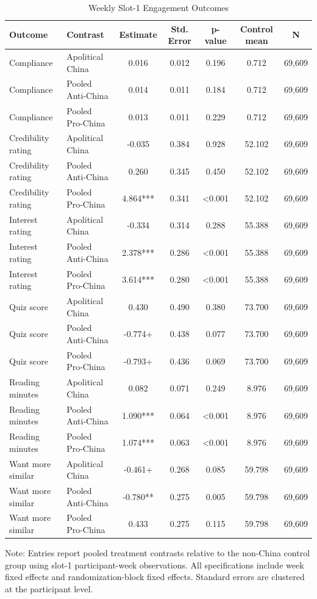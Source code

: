 \begin{table}[H]
\centering
\caption{Weekly Slot-1 Engagement Outcomes}
\label{tab:weekly_panel_slot1}
\footnotesize
\begin{threeparttable}
\begin{tabular}{llccccc}
\toprule
Outcome & Contrast & Estimate & Std. Error & p-value & Control mean & N \\
\midrule
Compliance & Apolitical China & 0.016 & 0.012 & 0.196 & 0.712 & 69,609 \\
Compliance & Pooled Anti-China & 0.014 & 0.011 & 0.184 & 0.712 & 69,609 \\
Compliance & Pooled Pro-China & 0.013 & 0.011 & 0.229 & 0.712 & 69,609 \\
Credibility rating & Apolitical China & -0.035 & 0.384 & 0.928 & 52.102 & 69,609 \\
Credibility rating & Pooled Anti-China & 0.260 & 0.345 & 0.450 & 52.102 & 69,609 \\
Credibility rating & Pooled Pro-China & 4.864*** & 0.341 & <0.001 & 52.102 & 69,609 \\
Interest rating & Apolitical China & -0.334 & 0.314 & 0.288 & 55.388 & 69,609 \\
Interest rating & Pooled Anti-China & 2.378*** & 0.286 & <0.001 & 55.388 & 69,609 \\
Interest rating & Pooled Pro-China & 3.614*** & 0.280 & <0.001 & 55.388 & 69,609 \\
Quiz score & Apolitical China & 0.430 & 0.490 & 0.380 & 73.700 & 69,609 \\
Quiz score & Pooled Anti-China & -0.774+ & 0.438 & 0.077 & 73.700 & 69,609 \\
Quiz score & Pooled Pro-China & -0.793+ & 0.436 & 0.069 & 73.700 & 69,609 \\
Reading minutes & Apolitical China & 0.082 & 0.071 & 0.249 & 8.976 & 69,609 \\
Reading minutes & Pooled Anti-China & 1.090*** & 0.064 & <0.001 & 8.976 & 69,609 \\
Reading minutes & Pooled Pro-China & 1.074*** & 0.063 & <0.001 & 8.976 & 69,609 \\
Want more similar & Apolitical China & -0.461+ & 0.268 & 0.085 & 59.798 & 69,609 \\
Want more similar & Pooled Anti-China & -0.780** & 0.275 & 0.005 & 59.798 & 69,609 \\
Want more similar & Pooled Pro-China & 0.433 & 0.275 & 0.115 & 59.798 & 69,609 \\
\bottomrule
\end{tabular}
\begin{tablenotes}[flushleft]
\footnotesize
\item Note: Entries report pooled treatment contrasts relative to the non-China control group using slot-1 participant-week observations. All specifications include week fixed effects and randomization-block fixed effects. Standard errors are clustered at the participant level.
\end{tablenotes}
\end{threeparttable}
\end{table}
